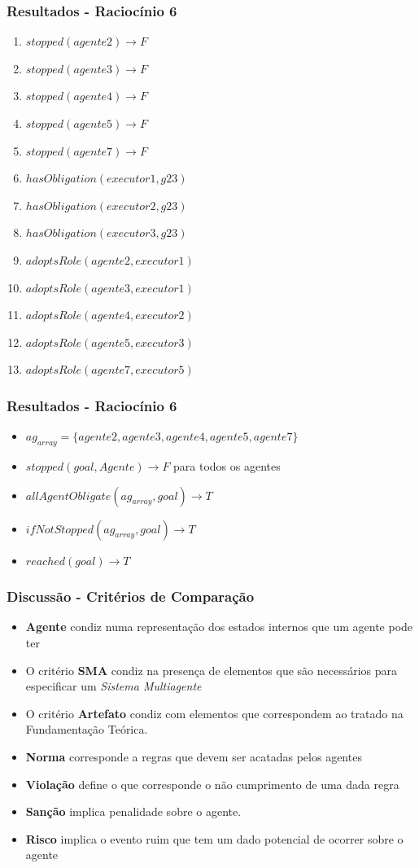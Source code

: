 \documentclass{beamer}
\begin{document}
\begin{frame}
	\frametitle{Resultados - Raciocínio 6}
	\begin{enumerate}
		\item $stopped(agente2) \to F$	
		\item $stopped(agente3) \to F$
		\item $stopped(agente4) \to F$
		\item $stopped(agente5) \to F$
		\item $stopped(agente7) \to F$
		\item $hasObligation(executor1,g23)$	
		\item $hasObligation(executor2,g23)$	
		\item $hasObligation(executor3,g23)$		
		\item $adoptsRole(agente2,executor1)$
		\item $adoptsRole(agente3,executor1)$
		\item $adoptsRole(agente4,executor2)$
		\item $adoptsRole(agente5,executor3)$
		\item $adoptsRole(agente7,executor5)$
	\end{enumerate}
\end{frame}
\begin{frame}
	\frametitle{Resultados - Raciocínio 6}
	\begin{itemize}
		\item $ag_{array} = \{ agente2,agente3,agente4,agente5,agente7 \}$
		\item $stopped(goal,Agente) \to F$ para todos os agentes		
		\item $allAgentObligate(ag_{array},goal) \to T$
		\item $ifNotStopped(ag_{array},goal) \to T$
		\item $reached(goal) \to T$
	\end{itemize}
\end{frame}
\begin{frame}
	\frametitle{Discussão - Critérios de Comparação}
	\begin{itemize}
		\item \textbf{Agente} condiz numa representação dos estados internos que um agente pode ter
		\item O critério \textbf{SMA} condiz na presença de elementos que são necessários para especificar um \textit{Sistema Multiagente}
		\item O critério \textbf{Artefato} condiz com elementos que correspondem ao tratado na Fundamentação Teórica.
		\item \textbf{Norma} corresponde a regras que devem ser acatadas pelos agentes 
		\item \textbf{Violação} define o que corresponde o não cumprimento de uma dada regra
		\item \textbf{Sanção} implica penalidade sobre o agente.
		\item \textbf{Risco} implica o evento ruim que tem um dado potencial de ocorrer sobre o agente
	\end{itemize}
\end{frame}
\end{document}
